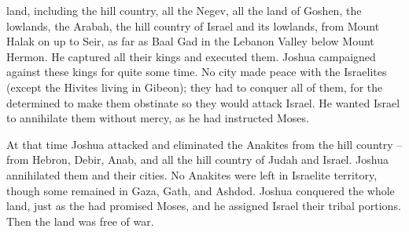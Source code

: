 {land,
including
the hill country,
all
the Negev,
all
the land
of Goshen,
the lowlands,
the Arabah,
the
hill country
of Israel
and its lowlands,
from
Mount
Halak
on up
to Seir,
as far
as Baal Gad
in the Lebanon
Valley
below
Mount
Hermon.
He captured
all
their kings
and executed them.
Joshua
campaigned
against
these
kings
for quite
some time.
No
city
made peace
with the Israelites
(except
the Hivites
living
in Gibeon); they had to conquer
all of them,
for
the {}
determined
to make them obstinate
so
they would
attack
Israel.
He wanted
Israel to annihilate
them
without
mercy,
as
he had
instructed
Moses.
\par }{\PP {}At that time
Joshua
attacked
and eliminated
the Anakites
from
the hill country –
from
Hebron,
Debir,
Anab,
and all
the hill country
of Judah
and Israel.
Joshua
annihilated
them and their cities.
No
Anakites
were left
in Israelite
territory, though some remained
in Gaza,
Gath,
and Ashdod.
Joshua
conquered
the whole
land,
just
as the
{}
had promised
Moses,
and he
assigned
Israel
their tribal
portions.
Then the land
was free
of war.

}
